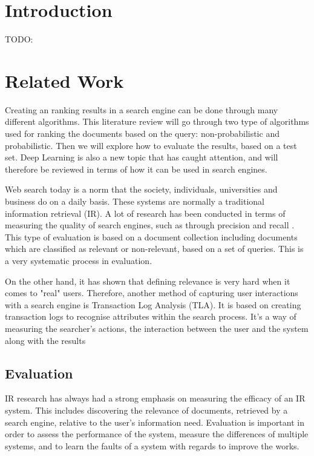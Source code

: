 \section{Introduction}

TODO:

\section{Related Work}
Creating an ranking results in a search engine can be done through many different algorithms. This literature review will go through two type of algorithms used for ranking the documents based on the query: non-probabilistic and probabilistic. Then we will explore how to evaluate the results, based on a test set. Deep Learning is also a new topic that has caught attention, and will therefore be reviewed in terms of how it can be used in search engines.

Web search today is a norm that the society, individuals, universities and business do on a daily basis. These systems are normally a traditional information retrieval (IR). A lot of research has been conducted in terms of measuring the quality of search engines, such as through precision and recall \cite{jones1981information}. This type of evaluation is based on a document collection including documents which are classified as relevant or non-relevant, based on a set of queries. This is a very systematic process in evaluation.

On the other hand, it has shown that defining relevance is very hard when it comes to "real" users\cite{mizzaro1997relevance}. Therefore, another method of capturing user interactions with a search engine is Transaction Log Analysis (TLA). It is based on creating transaction logs to recognise attributes within the search process. It's a way of measuring the searcher's actions, the interaction between the user and the system along with the results 




\subsection{Evaluation} %
\label{sub:evaluation}

IR research has always had a strong emphasis on measuring the efficacy of an IR system. This includes discovering the relevance of documents, retrieved by a search engine, relative to the user's information need. Evaluation is important in order to assess the performance of the system, measure the differences of multiple systems, and to learn the faults of a system with regards to improve the works.

